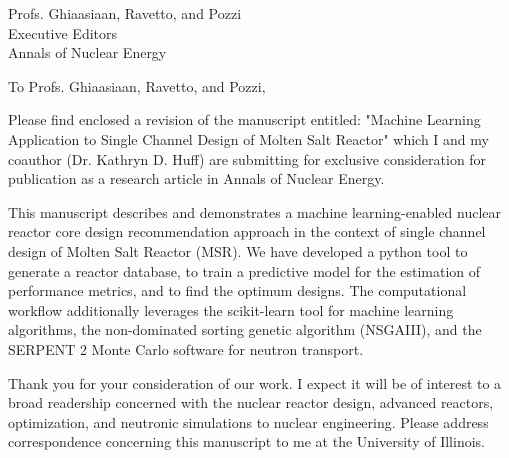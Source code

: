 \documentclass[11pt]{letter} %
\newcommand{\RecipientName}{Profs. Ghiaasiaan, Ravetto, and Pozzi\xspace}
\newcommand{\RecipientAddress}{Executive Editors\\Annals of Nuclear Energy}
\begin{document}


\begin{letter}{\RecipientName\\
        \RecipientAddress\xspace}


\address{Mehmet Turkmen\\
mturkmen@illinois.edu\\
119 Talbot Laboratory\\
MC-234\\
104 S. Wright Street\\
Urbana, IL 61801}



\opening{To \RecipientName,}

Please find enclosed a revision of the manuscript entitled: "Machine Learning
Application to Single Channel Design of Molten Salt Reactor" which I and my
coauthor (Dr. Kathryn D. Huff) are submitting for exclusive consideration for
publication as a research article in Annals of Nuclear Energy.

This manuscript describes and demonstrates a machine learning-enabled nuclear
reactor core design recommendation approach in the context of single channel
design of Molten Salt Reactor (MSR).  We have developed a python tool to
generate a reactor database, to train a predictive model for the estimation of
performance metrics, and to find the optimum designs. The computational workflow
additionally leverages the scikit-learn tool for machine learning algorithms,
the non-dominated sorting genetic algorithm (NSGAIII), and the SERPENT 2 Monte
Carlo software for neutron transport.

Thank you for your consideration of our work. I expect it will be of interest to
a broad readership concerned with the nuclear reactor design, advanced reactors,
optimization, and neutronic simulations to nuclear engineering.  Please address
correspondence concerning this manuscript to me at the University of Illinois.


\end{letter}
\end{document}
